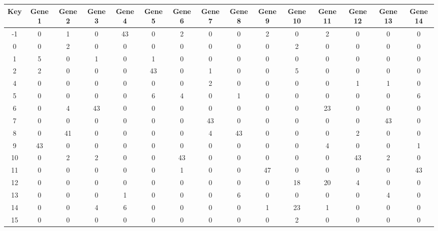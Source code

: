 \begin{tabular}{|c|c|c|c|c|c|c|c|c|c|c|c|c|c|c|}
\hline
Key & Gene 1 & Gene 2 & Gene 3 & Gene 4 & Gene 5 & Gene 6 & Gene 7 & Gene 8 & Gene 9 & Gene 10 & Gene 11 & Gene 12 & Gene 13 & Gene 14 \\
\hline
-1 & 0 & 1 & 0 & 43 & 0 & 2 & 0 & 0 & 2 & 0 & 2 & 0 & 0 & 0 \\
0 & 0 & 2 & 0 & 0 & 0 & 0 & 0 & 0 & 0 & 2 & 0 & 0 & 0 & 0 \\
1 & 5 & 0 & 1 & 0 & 1 & 0 & 0 & 0 & 0 & 0 & 0 & 0 & 0 & 0 \\
2 & 2 & 0 & 0 & 0 & 43 & 0 & 1 & 0 & 0 & 5 & 0 & 0 & 0 & 0 \\
4 & 0 & 0 & 0 & 0 & 0 & 0 & 2 & 0 & 0 & 0 & 0 & 1 & 1 & 0 \\
5 & 0 & 0 & 0 & 0 & 6 & 4 & 0 & 1 & 0 & 0 & 0 & 0 & 0 & 6 \\
6 & 0 & 4 & 43 & 0 & 0 & 0 & 0 & 0 & 0 & 0 & 23 & 0 & 0 & 0 \\
7 & 0 & 0 & 0 & 0 & 0 & 0 & 43 & 0 & 0 & 0 & 0 & 0 & 43 & 0 \\
8 & 0 & 41 & 0 & 0 & 0 & 0 & 4 & 43 & 0 & 0 & 0 & 2 & 0 & 0 \\
9 & 43 & 0 & 0 & 0 & 0 & 0 & 0 & 0 & 0 & 0 & 4 & 0 & 0 & 1 \\
10 & 0 & 2 & 2 & 0 & 0 & 43 & 0 & 0 & 0 & 0 & 0 & 43 & 2 & 0 \\
11 & 0 & 0 & 0 & 0 & 0 & 1 & 0 & 0 & 47 & 0 & 0 & 0 & 0 & 43 \\
12 & 0 & 0 & 0 & 0 & 0 & 0 & 0 & 0 & 0 & 18 & 20 & 4 & 0 & 0 \\
13 & 0 & 0 & 0 & 1 & 0 & 0 & 0 & 6 & 0 & 0 & 0 & 0 & 4 & 0 \\
14 & 0 & 0 & 4 & 6 & 0 & 0 & 0 & 0 & 1 & 23 & 1 & 0 & 0 & 0 \\
15 & 0 & 0 & 0 & 0 & 0 & 0 & 0 & 0 & 0 & 2 & 0 & 0 & 0 & 0 \\
\hline
\end{tabular}